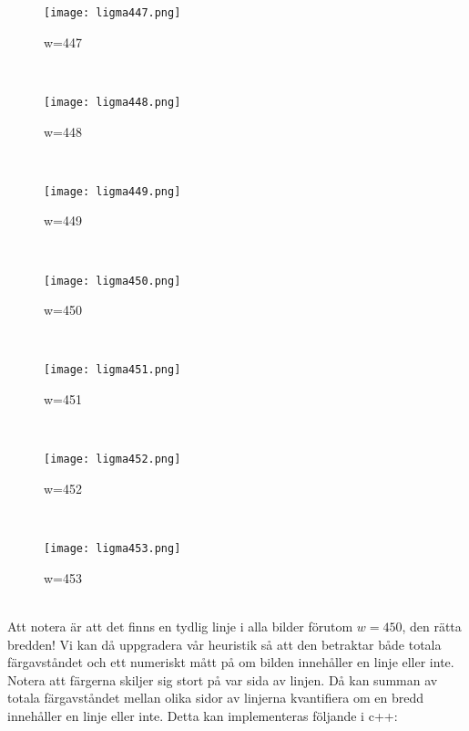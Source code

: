 \documentclass{article}
\begin{document}
\begin{figure}[h!]
    \centering
    \texttt{[image: ligma447.png]}\\
\caption{w=447}
\end{figure}
\\
\begin{figure}[h!]
    \centering
    \texttt{[image: ligma448.png]}\\
\caption{w=448}
\end{figure}
\\
\begin{figure}[h!]
    \centering
    \texttt{[image: ligma449.png]}\\
\caption{w=449}
\end{figure}
\\
\begin{figure}[h!]
    \centering
    \texttt{[image: ligma450.png]}\\
\caption{w=450}
\end{figure}
\\
\begin{figure}[h!]
    \centering
    \texttt{[image: ligma451.png]}\\
\caption{w=451}
\end{figure}
\\
\begin{figure}[h!]
    \centering
    \texttt{[image: ligma452.png]}\\
\caption{w=452}
\end{figure}
\\
\clearpage
\begin{figure}[h!]
    \centering
    \texttt{[image: ligma453.png]}\\
\caption{w=453}
\end{figure}
\\

Att notera är att det finns en tydlig linje i alla bilder förutom $w=450$, den rätta bredden! Vi kan då uppgradera vår heuristik så att den betraktar både totala färgavståndet och ett numeriskt mått på om bilden innehåller en linje eller inte. Notera att färgerna skiljer sig stort på var sida av linjen. Då kan summan av totala färgavståndet mellan olika sidor av linjerna kvantifiera om en bredd innehåller en linje eller inte. Detta kan implementeras följande i c++: 
\end{document}
